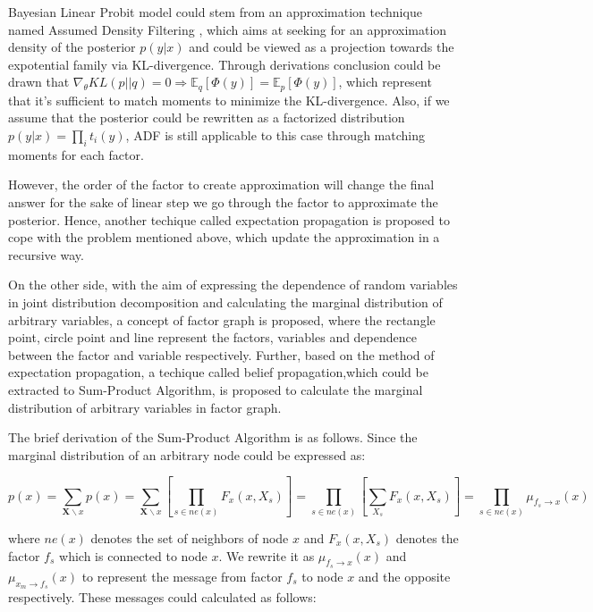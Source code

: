 \documentclass{article}
\begin{document}
Bayesian Linear Probit model could stem from an approximation technique named Assumed Density Filtering \cite{EP}, which aims at seeking for an approximation density of the posterior $p(y|x)$ and could be viewed as a projection towards the expotential family via KL-divergence. Through derivations conclusion could be drawn that $\nabla_{\theta} KL(p||q) = 0 \Rightarrow \mathbb{E}_q [\Phi(y)] = \mathbb{E}_p [\Phi(y)]$, which represent that it's sufficient to match moments to minimize the KL-divergence. Also, if we assume that the posterior could be rewritten as a factorized distribution $p(y|x) = \prod_i t_i(y)$, ADF is still applicable to this case through matching moments for each factor. 

However, the order of the factor to create approximation will change the final answer for the sake of linear step we go through the factor to approximate the posterior. Hence, another techique called expectation propagation is proposed to cope with the problem mentioned above, which update the approximation in a recursive way. 

On the other side, with the aim of expressing the dependence of random variables in joint distribution decomposition and calculating the marginal distribution of arbitrary variables, a concept of factor graph is proposed, where the rectangle point, circle point and line represent the factors, variables and dependence between the factor and variable respectively. Further, based on the method of expectation propagation, a techique called belief propagation,which could be extracted to Sum-Product Algorithm, is proposed to calculate the marginal distribution of arbitrary variables in factor graph. 

The brief derivation of the Sum-Product Algorithm \cite{PRML} is as follows. Since the marginal distribution of an arbitrary node could be expressed as:

\begin{equation}
  p(x) = \sum_{\textbf{X} \backslash x} p(x) = \sum_{\textbf{X}\backslash x} [\prod_{s \in ne(x)} F_x(x,X_s)] = \prod_{s \in ne(x)} [\sum_{X_s} F_x(x,X_s)] = \prod_{s \in ne(x)} \mu_{f_s \rightarrow x}(x)
\end{equation}

where $ne(x)$ denotes the set of neighbors of node $x$ and $F_x(x,X_s)$ denotes the factor $f_s$ which is connected to node $x$. We rewrite it as $\mu_{f_s \rightarrow x}(x)$ and $\mu_{x_m \rightarrow f_s}(x)$ to represent the message from factor $f_s$ to node $x$ and the opposite respectively. These messages could calculated as follows:
\end{document}
